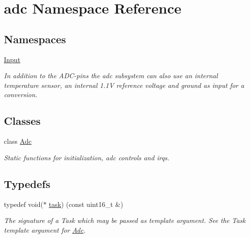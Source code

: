 \hypertarget{namespaceadc}{}\section{adc Namespace Reference}
\label{namespaceadc}
\subsection*{Namespaces}
\begin{DoxyCompactItemize}
\item 
 \hyperlink{namespaceadc_1_1Input}{Input}
\begin{DoxyCompactList}\small\item\em In addition to the A\+D\+C-\/pins the adc subsystem can also use an internal temperature sensor, an internal 1.\+1V reference voltage and ground as input for a conversion. \end{DoxyCompactList}\end{DoxyCompactItemize}
\subsection*{Classes}
\begin{DoxyCompactItemize}
\item 
class \hyperlink{classadc_1_1Adc}{Adc}
\begin{DoxyCompactList}\small\item\em Static functions for initialization, adc controls and irqs. \end{DoxyCompactList}\end{DoxyCompactItemize}
\subsection*{Typedefs}
\begin{DoxyCompactItemize}
\item 
typedef void($\ast$ \hyperlink{namespaceadc_a0e6e6773a0ed848acb0887f1ed3c76ae}{task}) (const uint16\+\_\+t \&)\hypertarget{namespaceadc_a0e6e6773a0ed848acb0887f1ed3c76ae}{}\label{namespaceadc_a0e6e6773a0ed848acb0887f1ed3c76ae}

\begin{DoxyCompactList}\small\item\em The signature of a {\ttfamily Task} which may be passed as template argument. See the {\ttfamily Task} template argument for {\ttfamily \hyperlink{classadc_1_1Adc}{Adc}}. \end{DoxyCompactList}\end{DoxyCompactItemize}
